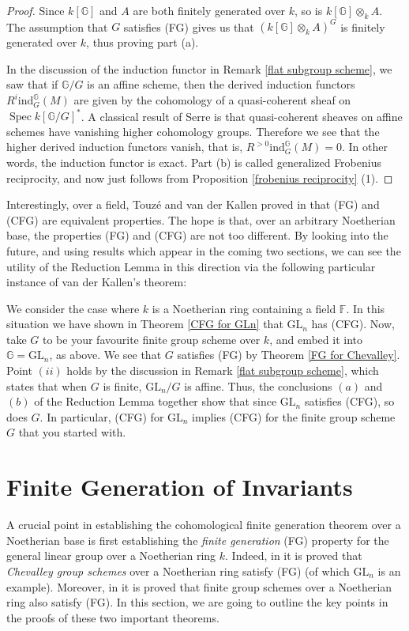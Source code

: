 \documentclass{article}
\theoremstyle{plain}
\theoremstyle{definition}
\DeclareMathOperator{\Spec}{Spec}
\newcommand{\GL}{\mathrm{GL}}
\begin{document}
\begin{proof}
    Since $k[\mathbb{G}]$ and $A$ are both finitely generated over $k$, so is $k[\mathbb{G}]\otimes_k A$. The assumption that $G$ satisfies (FG) gives us that $(k[\mathbb{G}]\otimes_k A)^G$ is finitely generated over $k$, thus proving part (a).
    
    In the discussion of the induction functor in Remark \ref{flat subgroup scheme}, we saw that if $\mathbb{G}/G$ is an affine scheme, then the derived induction functors $R^i\mathrm{ind}^\mathbb{G}_G(M)$ are given by the cohomology of a quasi-coherent sheaf on $\Spec k[\mathbb{G}/G]^*$. A classical result of Serre \cite[III 3.7]{hartshorne2013algebraic} is that quasi-coherent sheaves on affine schemes have vanishing higher cohomology groups. Therefore we see that the higher derived induction functors vanish, that is,  $R^{>0}\mathrm{ind}^\mathbb{G}_G(M)=0$. In other words, the induction functor is exact. Part (b) is called generalized Frobenius reciprocity, and now just follows from Proposition \ref{frobenius reciprocity} (1).
\end{proof}

Interestingly, over a field, Touz\'e and van der Kallen proved in \cite{TvdK10} that (FG) and (CFG) are equivalent properties. The hope is that, over an arbitrary Noetherian base, the properties (FG) and (CFG) are not too different. By looking into the future, and using results which appear in the coming two sections, we can see the utility of the Reduction Lemma in this direction via the following particular instance of van der Kallen's theorem:

We consider the case where $k$ is a Noetherian ring containing a field $\mathbb{F}$. In this situation we have shown in Theorem \ref{CFG for GLn} that $\GL_n$ has (CFG). Now, take $G$ to be your favourite finite group scheme over $k$, and embed it into $\mathbb{G} = \GL_n$, as above. We see that $G$ satisfies (FG) by Theorem \ref{FG for Chevalley}. Point $(ii)$ holds by the discussion in Remark \ref{flat subgroup scheme}, which states that when $G$ is finite, $\GL_n/G$ is affine. Thus, the conclusions $(a)$ and $(b)$ of the Reduction Lemma together show that since $\GL_n$ satisfies (CFG), so does $G$. In particular, (CFG) for $\GL_n$ implies (CFG) for the finite group scheme $G$ that you started with.



\section{Finite Generation of Invariants}\label{section: FG}
A crucial point in establishing the cohomological finite generation theorem over a Noetherian base is first establishing the \textit{finite generation} (FG) property for the general linear group over a Noetherian ring $k$. Indeed, in \cite{FvdK10} it is proved that \textit{Chevalley group schemes} over a Noetherian ring satisfy (FG) (of which $\text{GL}_n$ is an example). Moreover, in \cite{van2021reductivity} it is proved that finite group schemes over a Noetherian ring also satisfy (FG). In this section, we are going to outline the key points in the proofs of these two important theorems.
\end{document}
